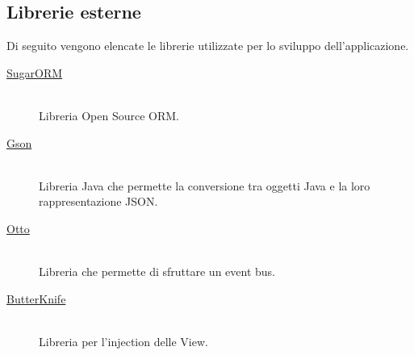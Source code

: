 


\subsection{Librerie esterne}
Di seguito vengono elencate le librerie utilizzate per lo sviluppo dell'applicazione.

\begin{description}

\item[\href{http://satyan.github.io/sugar}{SugarORM}] \hfill \\
Libreria Open Source ORM.

\item[\href{https://code.google.com/p/google-gson/}{Gson}] \hfill \\
Libreria Java che permette la conversione tra oggetti Java e la loro rappresentazione JSON.

\item[\href{http://square.github.io/otto/}{Otto}] \hfill \\
Libreria che permette di sfruttare un event bus.

\item[\href{https://github.com/JakeWharton/butterknife}{ButterKnife}] \hfill \\
Libreria per l'injection delle View.
\end{description}
